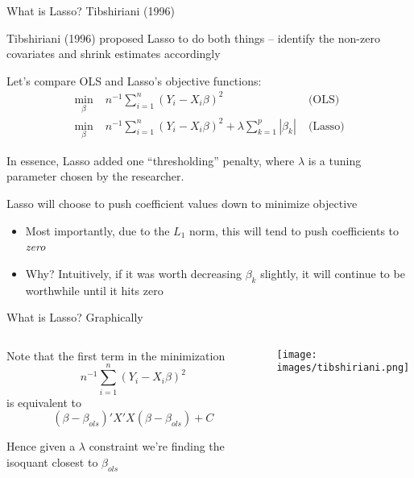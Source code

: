 \documentclass[notes,11pt, aspectratio=169]{beamer}
\newenvironment{wideitemize}{\itemize\addtolength{\itemsep}{10pt}}{\enditemize}
\begin{document}
\begin{frame}{What is Lasso? Tibshiriani (1996)}
  \begin{wideitemize}
  \item Tibshiriani (1996) proposed Lasso to do both things -- identify the
    non-zero covariates and shrink estimates accordingly
  \item Let's compare OLS and Lasso's objective functions:
        \begin{align*}
      \min_{\beta} \; & n^{-1}\sum_{i=1}^{n}(Y_{i} - X_{i}\beta)^{2}   \;& \text{(OLS)}\\
      \min_{\beta} \;& n^{-1}\sum_{i=1}^{n}(Y_{i} - X_{i}\beta)^{2} + \lambda \sum_{k=1}^{p}|\beta_{k}|   \;& \text{(Lasso)}     \end{align*}
  \item In essence, Lasso added one ``thresholding'' penalty, where
    $\lambda$ is a tuning parameter chosen by the researcher.
  \item Lasso will choose to push coefficient values down to minimize objective 
    \begin{itemize}
    \item Most importantly, due to the $L_{1}$ norm, this will tend to push coefficients to \emph{zero}
    \item Why? Intuitively, if it was worth decreasing $\beta_{k}$
      slightly, it will continue to be worthwhile until it hits zero
    \end{itemize}
  \end{wideitemize}
\end{frame}

\begin{frame}{What is Lasso? Graphically}
  \begin{columns}[T] %
    \begin{column}{.35\textwidth}
      \begin{wideitemize}
      \item Note that the first term in the  minimization
        $$n^{-1}\sum_{i=1}^{n}(Y_{i} - X_{i}\beta)^{2}$$
        is equivalent to
        $$(\beta- \beta_{ols})'X'X(\beta- \beta_{ols}) + C$$
      \item Hence given a $\lambda$ constraint we're finding the
        isoquant closest to $\beta_{ols}$
      \end{wideitemize}
    \end{column}%
  \hfill%
  \begin{column}{.65\textwidth}
    \texttt{[image: images/tibshiriani.png]}
  \end{column}
\end{columns}
\end{frame}
\end{document}
